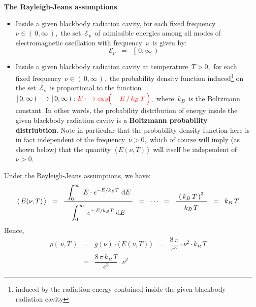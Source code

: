 \noindent
\textbf{The Rayleigh-Jeans assumptions}
\begin{itemize}
\item
    Inside a given blackbody radiation cavity,
    for each fixed frequency \,$\nu \in (\,0,\infty\,)$,\,
    the set \,$\mathscr{E}_{\nu}$\, of admissible energies
    among all modes of electromagnetic oscillation
    with frequency \,$\nu$\, is given by:
    \begin{equation*}
    \mathscr{E}_{\nu}
    \;\; = \;\;
        \left[\,0,\infty\,\right)
    \end{equation*}
\item
    Inside a given blackbody radiation cavity at temperature \,$T > 0$,\,
    for each fixed frequency \,$\nu \in (\,0,\infty\,)$,\,
    the probability density function
    induced\footnote{induced by the radiation energy contained inside the given blackbody radiation cavity}
    on the set \,$\mathscr{E}_{\nu}$\, is proportional to the function
    \,$
    [\,0,\infty\,) \xrightarrow{{\color{white}....}} [\,0,\infty\,) :
    {\color{red}
    E \xmapsto{{\color{white}....}} \exp\!\left(\,\overset{{\color{white}.}}{-\,E\,/\,k_{B}\,T}\,\right)
    }
    $,\,
    where \,$k_{B}$\, is the Boltzmann constant.
    In other words, the probability distribution of energy
    inside the given blackbody radiation cavity
    is a \textbf{Boltzmann probability distriubtion}.
    \vskip 0.01cm
    Note in particular that the probability density function here
    is in fact independent of the frequency \,$\nu > 0$,\,
    which of course will imply (as shown below) that the quantity
    \,$\langle\,E(\nu,T)\,\rangle$\,
    will itself be independent of \,$\nu > 0$.\,    
\end{itemize}
\vskip 0.2cm
Under the Reyleigh-Jeans assumptions, we have:
\begin{equation*}
\langle\,E(\nu,T)\,\rangle
\;\; = \;\;
    \dfrac{
        {\color{white}.}
        \displaystyle\int_{0}^{\infty}\;
            E \cdot e^{-E/k_{B}T}
            \;\d E
        {\color{white}.}
        }{
        \overset{{\color{white}.}}{
            \displaystyle\int_{0}^{\infty}\;
                e^{-\,E /k_{B}T}
                \;\d E
            }
        }
\;\; = \;\;
    \cdots
\;\; = \;\;
    \dfrac{
        {\color{white}.}
        \left(\,k_{B}\,T\,\right)^{2}
        {\color{white}.}
        }{
        \overset{{\color{white}.}}{
            k_{B}\,T
            }
        }
\;\; = \;\;
    k_{B}\,T
\end{equation*}
Hence,
\begin{eqnarray*}
\rho(\,\nu,T\,)
& = &
    g(\nu)
    \cdot
    \langle\,E(\nu,T)\,\rangle
\;\; = \;\;
    \dfrac{
        8\,\pi
        }{
        c^{3}
        }
    \cdot
    \nu^{2}
    \cdot
    k_{B}\,T
\\
& = &
    \dfrac{
        8\,\pi\,k_{B}\,T
        }{
        c^{3}
        }
    \cdot
    \nu^{2}
\end{eqnarray*}

